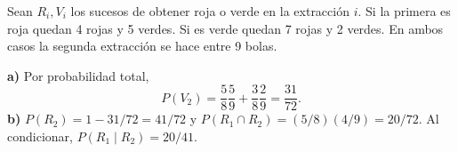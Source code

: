 Sean $R_i,V_i$ los sucesos de obtener roja o verde en la
extracción $i$. Si la primera es roja quedan 4 rojas y 5
verdes. Si es verde quedan 7 rojas y 2 verdes. En ambos
casos la segunda extracción se hace entre 9 bolas.

\textbf{a)} Por probabilidad total,
\[
P(V_2)=\frac58\frac59+\frac38\frac29=\boxed{\frac{31}{72}}.
\]
\textbf{b)} $P(R_2)=1-31/72=41/72$ y
$P(R_1\cap R_2)=(5/8)(4/9)=20/72$.
Al condicionar, $P(R_1\mid R_2)=\boxed{20/41}$.
